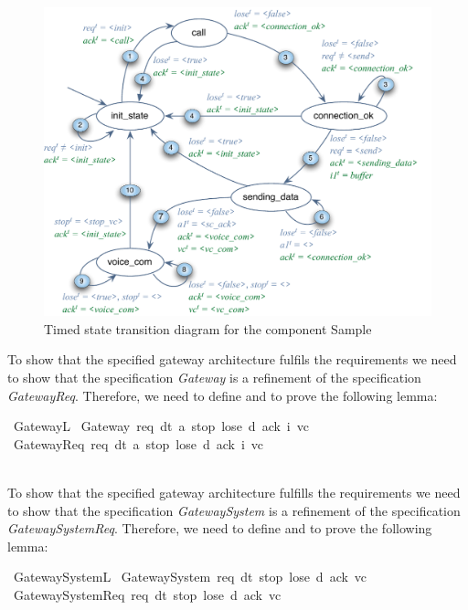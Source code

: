   
 \begin{figure}[h]
	\begin{center}
		\includegraphics[scale=0.6]{fig/gatewayTSTD.pdf}
	\end{center}
	\caption{Timed state transition diagram for the component Sample}
	\label{fig:gateway_std}
\end{figure} 


  To show that the specified gateway architecture fulfils the requirements we need to show that
the specification \emph{Gateway} is a refinement of the specification \emph{GatewayReq}. 
Therefore, we need to define and to prove the following lemma:
\\

\begin{isabellebody}%
\isamarkupfalse%
\ Gateway{\isacharunderscore}L{}{\isacharcolon}\isanewline
\ Gateway\ req\ dt\ a\ stop\ lose\ d\ ack\ i\ vc\isanewline
\ {\isasymLongrightarrow} 
\ GatewayReq\ req\ dt\ a\ stop\ lose\ d\ ack\ i\ vc
\end{isabellebody}%

~\\
To show that the specified gateway architecture fulfills the requirements we need to show that
the specification \emph{GatewaySystem} is a refinement of the specification \emph{GatewaySystemReq}. 
Therefore, we need to define and to prove the following lemma:
\\

\begin{isabellebody}%
\isamarkupfalse%
\ GatewaySystem{\isacharunderscore}L{}{\isacharcolon}\isanewline
\ GatewaySystem\ req\ dt\ stop\ lose\ d\ ack\ vc\isanewline
\ {\isasymLongrightarrow} 
\ GatewaySystemReq\ req\ dt\ stop\ lose\ d\ ack\ vc\isanewline
\end{isabellebody}%
  
%